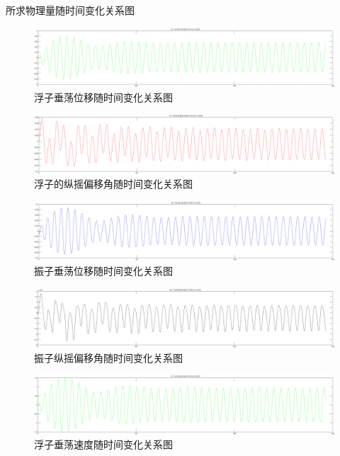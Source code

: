 \documentclass{article}
\numberwithin{equation}{subsection}
\begin{document}
所求物理量随时间变化关系图
\begin{figure}[H]
    \centering
    \includegraphics[scale=0.3]{问题3-1.png}
    \caption{浮子垂荡位移随时间变化关系图}
\end{figure}
\begin{figure}[H]
    \centering
    \includegraphics[scale=0.3]{问题3-2.png}
    \caption{浮子的纵摇偏移角随时间变化关系图}
\end{figure}
\begin{figure}[H]
    \centering
    \includegraphics[scale=0.3]{问题3-3.png}
    \caption{振子垂荡位移随时间变化关系图}
\end{figure}
\begin{figure}[H]
    \centering
    \includegraphics[scale=0.3]{问题3-4.png}
    \caption{振子纵摇偏移角随时间变化关系图}
\end{figure}
\begin{figure}[H]
    \centering
    \includegraphics[scale=0.3]{问题3-5.png}
    \caption{浮子垂荡速度随时间变化关系图}
\end{figure}
\end{document}
